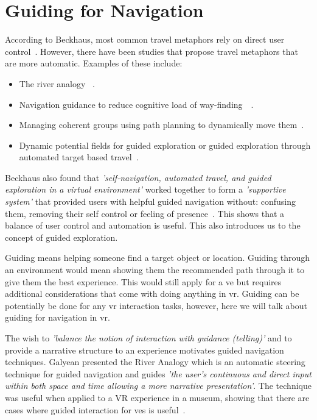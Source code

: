 \section{Guiding for Navigation}
\label{section RW: Guiding for Navigation}
According to Beckhaus, most common travel metaphors rely on direct user control~\cite[p. 6]{Beckhaus2002}. However, there have been studies that propose travel metaphors that are more automatic. Examples of these include:
\begin{itemize}
	\item The river analogy ~\cite{Galyean1995}.
	\item Navigation guidance to reduce cognitive load of way-finding~\cite{Elmqvist2005}~\cite{Elmqvist2008}.
	\item Managing coherent groups using path planning to dynamically move them~\cite{Silveira2008}.
	\item Dynamic potential fields for guided exploration or guided exploration through automated target based travel~\cite{Beckhaus2002}. 
\end{itemize}

Beckhaus also found that \textit{'self-navigation, automated travel, and guided exploration in a virtual environment'} worked together to form a \textit{'supportive system'} that provided users with helpful guided navigation without: confusing them, removing their self control or feeling of presence~\cite[p. 8]{Beckhaus2002}. This shows that a balance of user control and automation is useful. This also introduces us to the concept of guided exploration.

Guiding means helping someone find a target object or location. Guiding through an environment would mean showing them the recommended path through it to give them the best experience. This would still apply for a \acrshort{ve} but requires additional considerations that come with doing anything in \acrfull{vr}. Guiding can be potentially be done for any \acrshort{vr} interaction tasks, however, here we will talk about guiding for navigation in \acrshort{vr}.

The wish to \textit{'balance the notion of interaction with guidance (telling)'} and to provide a narrative structure to an experience motivates guided navigation techniques. Galyean presented the River Analogy which is an automatic steering technique for guided navigation and guides \textit{'the user’s continuous and direct input within both space and time allowing a more narrative presentation'}. The technique was useful when applied to a VR experience in a museum, showing that there are cases where guided interaction for \acrshort{ve}s is useful~\cite{Galyean1995}.

